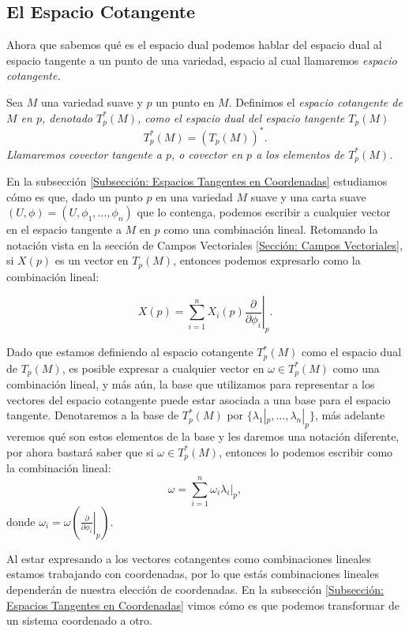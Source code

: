 \subsection{El Espacio Cotangente}\label{Subsección: El Espacio Cotangente}
Ahora que sabemos qué es el espacio dual podemos hablar del espacio dual al espacio tangente a un punto de una variedad, espacio al cual llamaremos \it{espacio cotangente}.

\begin{definition}
	Sea $M$ una variedad suave y $p$ un punto en $M$. Definimos el \it{espacio cotangente de $M$ en $p$}, denotado $T_{p}^{*}(M)$, como el espacio dual del espacio tangente $T_p(M)$
	\[
		T^{*}_p(M) = (T_p(M))^*.
	\]
	Llamaremos \textit{covector tangente a $p$}, o \textit{covector en $p$} a los elementos de $T_p^{*}(M)$.
\end{definition}

En la subsección \ref{Subsección: Espacios Tangentes en Coordenadas} estudiamos cómo es que, dado un punto $p$ en una variedad $M$ suave y una carta suave $(U,\phi) = (U,\phi_1,\ldots,\phi_n)$ que lo contenga, podemos escribir a cualquier vector en el espacio tangente a $M$ en $p$ como una combinación lineal. Retomando la notación vista en la sección de Campos Vectoriales \ref{Sección: Campos Vectoriales}, si $X(p)$ es un vector en $T_p(M)$, entonces podemos expresarlo como la combinación lineal:

\[
	X(p) = \sum_{i=1}^{n} X_i(p) \left. \frac{\partial}{\partial \phi_i} \right|_{p}.
\]

Dado que estamos definiendo al espacio cotangente $T_{p}^{*}(M)$ como el espacio dual de $T_p(M)$, es posible expresar a cualquier vector en $\omega \in T_{p}^{*}(M)$ como una combinación lineal, y más aún, la base que utilizamos para representar a los vectores del espacio cotangente puede estar asociada a una base para el espacio tangente. Denotaremos a la base de $T_{p}^{*}(M)$ por $\{\lambda_1|_p, \ldots, \lambda_n|_p\}$, más adelante veremos qué son estos elementos de la base y les daremos una notación diferente, por ahora bastará saber que si $\omega \in T_{p}^{*}(M)$, entonces lo podemos escribir como la combinación lineal:
\[
	\omega = \sum_{i=1}^{n} \omega_i \left. \lambda_i \right|_p,
\]
donde $\omega_i = \omega \left( \left. \frac{\partial}{\partial \phi_i} \right|_p\right)$.

Al estar expresando a los vectores cotangentes como combinaciones lineales estamos trabajando con coordenadas, por lo que estás combinaciones lineales dependerán de nuestra elección de coordenadas. En la subsección \ref{Subsección: Espacios Tangentes en Coordenadas} vimos cómo es que podemos transformar de un sistema coordenado a otro.


